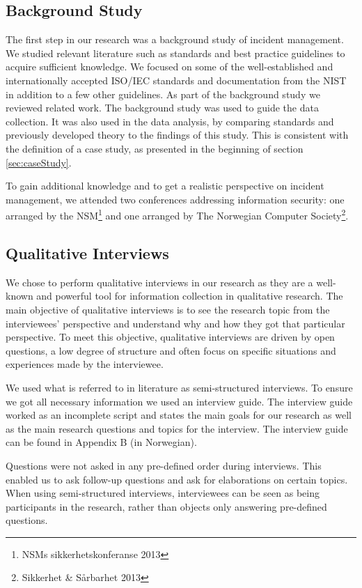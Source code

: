 \subsection{Background Study}
\label{sec:background}
The first step in our research was a background study of incident management. We studied relevant literature such as standards and best practice guidelines to acquire sufficient knowledge. We focused on some of the well-established and internationally accepted ISO/IEC standards and documentation from the \ac{NIST} in addition to a few other guidelines. As part of the background study we reviewed related work. The background study was used to guide the data collection. It was also used in the data analysis, by comparing standards and previously developed theory to the findings of this study. This is consistent with the definition of a case study, as presented in the beginning of section \ref{sec:caseStudy}.

To gain additional knowledge and to get a realistic perspective on incident management, we attended two conferences addressing information security: one arranged by the \ac{NSM}\footnote{NSMs sikkerhetskonferanse 2013} and one arranged by The Norwegian Computer Society\footnote{Sikkerhet \& S\aa rbarhet 2013}.

\subsection{Qualitative Interviews}
\label{sec:interviews}
We chose to perform qualitative interviews in our research as they are a well-known and powerful tool for information collection in qualitative research\cite{myers2007qualitative}. The main objective of qualitative interviews is to see the research topic from the interviewees' perspective and understand why and how they got that particular perspective\cite{cassell2004essential}. To meet this objective, qualitative interviews are driven by open questions, a low degree of structure and often focus on specific situations and experiences made by the interviewee. 

We used what is referred to in literature as semi-structured interviews\cite{cassell2004essential}. To ensure we got all necessary information we used an interview guide. The interview guide worked as an incomplete script and states the main goals for our research as well as the main research questions and topics for the interview. The interview guide can be found in Appendix B (in Norwegian).

Questions were not asked in any pre-defined order during interviews. This enabled us to ask follow-up questions and ask for elaborations on certain topics. When using semi-structured interviews, interviewees can be seen as being participants in the research, rather than objects only answering pre-defined questions.

